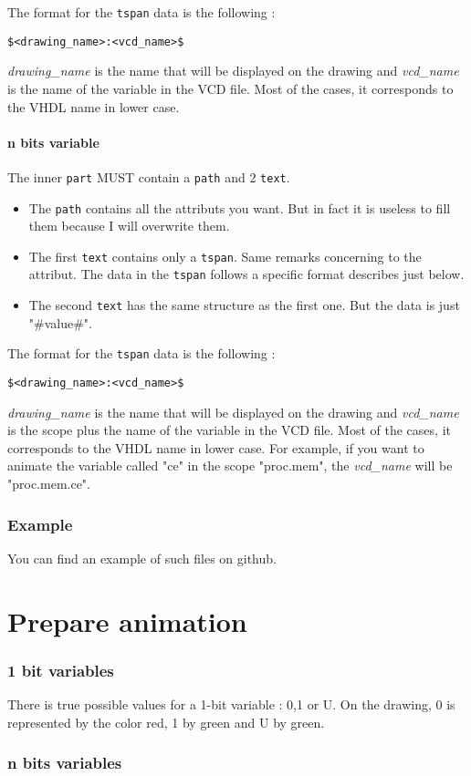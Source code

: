 \documentclass[a4paper]{article}
\begin{document}
The format for the \texttt{tspan} data is the following :
\begin{center}
\texttt{\$<drawing\_name>:<vcd\_name>\$}
\end{center}
\emph{drawing\_name} is the name that will be displayed on the drawing and \emph{vcd\_name} is the name of the variable in the VCD file. Most of the cases, it corresponds to the VHDL name in lower case.

\subsection{n bits variable}
The inner \texttt{part} MUST contain a \texttt{path} and 2 \texttt{text}. 
\begin{itemize}
\item The \texttt{path} contains all the attributs you want. But in fact it is useless to fill them because  I will overwrite them.
\item The first \texttt{text} contains only a \texttt{tspan}. Same remarks concerning to the attribut. The data in the \texttt{tspan} follows a specific format describes just below.
\item The second \texttt{text} has the same structure as the first one. But the data is just "\#value\#". 
\end{itemize}

The format for the \texttt{tspan} data is the following :
\begin{center}
\texttt{\$<drawing\_name>:<vcd\_name>\$}
\end{center}
\emph{drawing\_name} is the name that will be displayed on the drawing and \emph{vcd\_name} is the scope plus the name of the variable in the VCD file. Most of the cases, it corresponds to the VHDL name in lower case. 
For example, if you want to animate the variable called "ce" in the scope "proc.mem", the \emph{vcd\_name} will be "proc.mem.ce". 

\section{Example}
You can find an example of such files on github.

\newpage
\part{Prepare animation}
\newpage

\section{1 bit variables}
There is true possible values for a 1-bit variable : 0,1 or U. On the drawing, 0 is represented by the color red, 1 by green and U by green.
\section{n bits variables}
\end{document}
